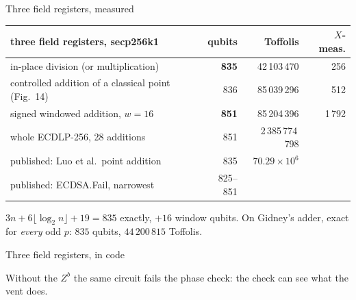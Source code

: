 \documentclass[aspectratio=169,11pt]{beamer}
\newcommand{\code}[2][]{}
\begin{document}
\setcounter{framenumber}{190}
\begin{frame}{Three field registers, measured}
  \centering
  \vskip3mm
  \footnotesize
  \renewcommand{\arraystretch}{1.08}
  \begin{tabular}{@{}lrrr@{}}
    \toprule
    three field registers, secp256k1 & qubits & Toffolis & $X$-meas. \\
    \midrule
    in-place division (or multiplication) & \textbf{835} & 42\,103\,470 & 256 \\
    controlled addition of a classical point (Fig.~14) & 836 & 85\,039\,296 & 512 \\
    signed windowed addition, $w=16$ & \textbf{851} & 85\,204\,396 & 1\,792 \\
    whole ECDLP-256, 28 additions & 851 & 2\,385\,774\,798 & \\
    \midrule
    published: Luo et al.\ point addition & 835 & $70.29\times10^6$ & \\
    published: ECDSA.Fail, narrowest & 825--851 & & \\
    \bottomrule
  \end{tabular}\par
  \vskip2mm
  \raggedright{\small $3n+6\lfloor\log_2n\rfloor+19=835$ exactly, $+16$ window qubits. On Gidney's adder, exact for \emph{every} odd $p$: $835$ qubits, $44\,200\,815$ Toffolis.}
\end{frame}

\setcounter{framenumber}{191}
\begin{frame}[fragile]{Three field registers, in code}
  \code[basicstyle=\ttfamily\fontsize{7.3}{8.4}\selectfont]{div3.py}
  {\small Without the $Z^b$ the same circuit fails the phase check: the check can see what the vent does.}
\end{frame}
\end{document}

